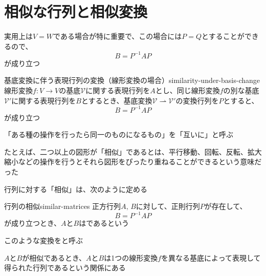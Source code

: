 \documentclass[../../../topic_linear-algebra]{subfiles}
\begin{document}
\sectionline
\section{相似な行列と相似変換}

\begin{mindflow}
\end{mindflow}

実用上は$V=W$である場合が特に重要で、この場合には$P=Q$とすることができるので、
\begin{equation*}
  B = P^{-1} A P
\end{equation*}
が成り立つ

\begin{theorem}{基底変換に伴う表現行列の変換（線形変換の場合）}{similarity-under-basis-change}
  線形変換$f\colon V \to V$の基底$\mathcal{V}$に関する表現行列を$A$とし、同じ線形変換$f$の別な基底$\mathcal{V}'$に関する表現行列を$B$とするとき、基底変換$\mathcal{V} \rightharpoonup \mathcal{V}'$の変換行列を$P$とすると、
  \begin{equation*}
    B = P^{-1} A P
  \end{equation*}
  が成り立つ
\end{theorem}

「ある種の操作を行ったら同一のものになるもの」を「互いに」と呼ぶ

\br

たとえば、二つ以上の図形が「相似」であるとは、平行移動、回転、反転、拡大縮小などの操作を行うとそれら図形をぴったり重ねることができるという意味だった

\br

行列に対する「相似」は、次のように定める

\begin{definition}{行列の相似}{similar-matrices}
  正方行列$A,\,B$に対して、正則行列$P$が存在して、
  \begin{equation*}
    B = P^{-1} A P
  \end{equation*}
  が成り立つとき、$A$と$B$はであるという
\end{definition}

このような変換をと呼ぶ

\br

$A$と$B$が相似であるとき、$A$と$B$は1つの線形変換$f$を異なる基底によって表現して得られた行列であるという関係にある
\end{document}
